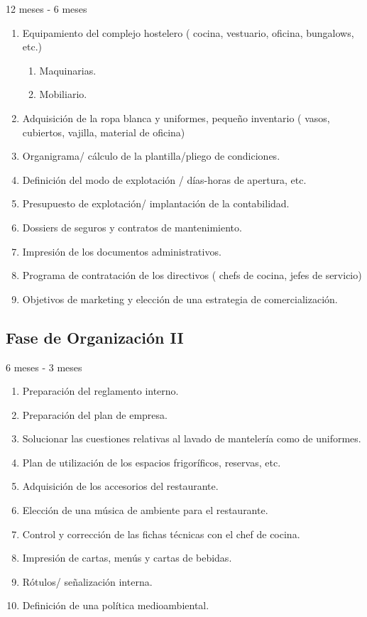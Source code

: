 12 meses - 6 meses

\begin{enumerate}
\item Equipamiento del complejo hostelero ( cocina, vestuario, oficina, bungalows, etc.)
	\begin{enumerate}
	\item Maquinarias.
	\item Mobiliario.
	\end{enumerate}
\item Adquisición de la ropa blanca y uniformes, pequeño inventario ( vasos, cubiertos, vajilla, material de oficina)
\item Organigrama/ cálculo de la plantilla/pliego de condiciones.
\item Definición del modo de explotación / días-horas de apertura, etc.
\item Presupuesto de explotación/ implantación de la contabilidad.
\item Dossiers de seguros y contratos de mantenimiento.
\item Impresión de los documentos administrativos.
\item Programa de contratación de los directivos ( chefs de cocina, jefes de servicio)
\item Objetivos de marketing y elección de una estrategia de comercialización.
\end{enumerate}

\subsection{Fase de Organización II}
\label{sec:organizacion2}

6 meses - 3 meses

\begin{enumerate}
\item Preparación del reglamento interno.
\item Preparación del plan de empresa.
\item Solucionar las cuestiones relativas al lavado de mantelería como de uniformes.
\item Plan de utilización de los espacios frigoríficos, reservas, etc.
\item Adquisición de los accesorios del restaurante.
\item Elección de una música de ambiente para el restaurante.
\item Control y corrección de las fichas técnicas con el chef de cocina.
\item Impresión de cartas, menús y cartas de bebidas.
\item Rótulos/ señalización interna.
\item Definición de una política medioambiental.
\end{enumerate}

